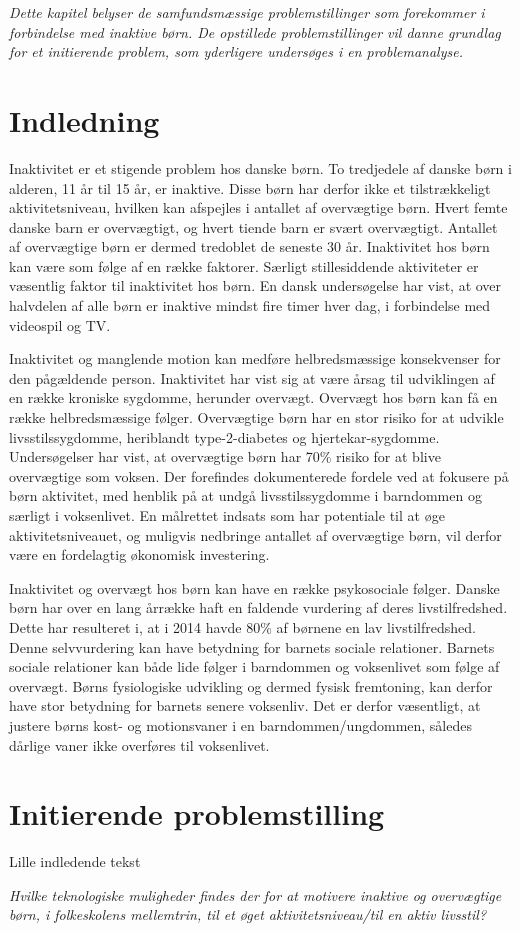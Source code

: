 \textit{Dette kapitel belyser de samfundsmæssige problemstillinger som forekommer i forbindelse med inaktive børn.
De opstillede problemstillinger vil danne grundlag for et initierende problem, som yderligere undersøges i en problemanalyse.}

\section{Indledning}
Inaktivitet er et stigende problem hos danske børn. To tredjedele af danske børn i alderen, 11 år til 15 år, er inaktive\citep{SundhedsstyrrelsenFaktaark}. Disse børn har derfor ikke et tilstrækkeligt aktivitetsniveau, hvilken kan  afspejles i antallet af overvægtige børn. Hvert femte danske barn er overvægtigt, og hvert tiende barn er svært overvægtigt\citep{Universitet2014}. Antallet af overvægtige børn er dermed tredoblet de seneste 30 år\citep{Vindum2012}. \newline
Inaktivitet hos børn kan være som følge af en række faktorer. Særligt stillesiddende aktiviteter er væsentlig faktor til inaktivitet hos børn. En dansk undersøgelse har vist, at over halvdelen af alle børn er inaktive mindst fire timer hver dag, i forbindelse med videospil og TV\citep{Universitet2014}.

Inaktivitet og manglende motion kan medføre helbredsmæssige konsekvenser for den pågældende person. Inaktivitet har vist sig at være årsag til udviklingen af en række kroniske sygdomme, herunder overvægt. \newline 
Overvægt hos børn kan få en række helbredsmæssige følger. Overvægtige børn har en stor risiko for at udvikle livsstilssygdomme, heriblandt type-2-diabetes og hjertekar-sygdomme. Undersøgelser har vist, at overvægtige børn har 70\% risiko for at blive overvægtige som voksen.\citep{Reilly2006}
Der forefindes dokumenterede fordele ved at fokusere på børn aktivitet, med henblik på at undgå livsstilssygdomme i barndommen og særligt i voksenlivet. En målrettet indsats som har potentiale til at øge aktivitetsniveauet, og muligvis nedbringe antallet af overvægtige børn, vil derfor være en fordelagtig økonomisk investering\citep{COWI2015}.

Inaktivitet og overvægt hos børn kan have en række psykosociale følger. Danske børn har over en lang årrække haft en faldende vurdering af deres livstilfredshed. Dette har resulteret i, at i 2014 havde 80\% af børnene en lav livstilfredshed\citep{Universitet2014}. Denne selvvurdering kan have betydning for barnets sociale relationer. Barnets sociale relationer kan både lide følger i barndommen og voksenlivet som følge af overvægt\citep{StatensInstitutforFolkesundhed2007}. \newline
Børns fysiologiske udvikling og dermed fysisk fremtoning, kan derfor have stor betydning for barnets senere voksenliv. Det er derfor væsentligt, at justere børns kost- og motionsvaner i en barndommen/ungdommen, således dårlige vaner ikke overføres til voksenlivet. 

\section{Initierende problemstilling}
Lille indledende tekst

\textit{Hvilke teknologiske muligheder findes der for at motivere inaktive og overvægtige børn, i folkeskolens mellemtrin, til et øget aktivitetsniveau/til en aktiv livsstil?}